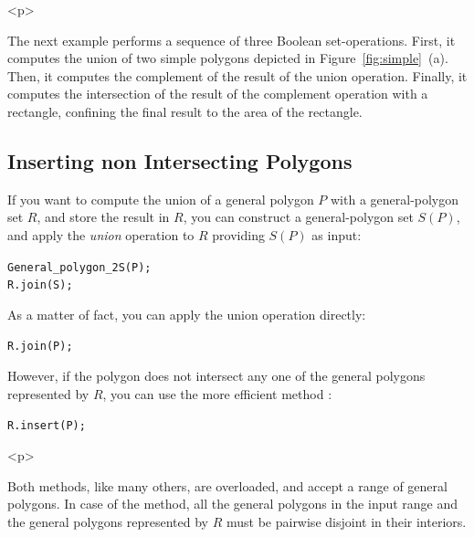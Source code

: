 \begin{ccHtmlOnly}<p>\end{ccHtmlOnly}
The next example performs a sequence of three Boolean set-operations.
First, it computes the union of two simple polygons depicted in
Figure~\ref{fig:simple}~(a). Then, it computes the complement of the result
of the union operation. Finally, it computes the intersection of the result
of the complement operation with a rectangle, confining the final result to 
the area of the rectangle.


\subsection{Inserting non Intersecting Polygons}
\label{bso_ssec:insert}
If you want to compute the union of a general polygon $P$ with a
general-polygon set $R$, and store the result in $R$, you can construct
a general-polygon set $S(P)$, and apply the {\em union} operation to
$R$ providing $S(P)$ as input:

\begin{alltt}
General_polygon_2 S(P);
R.join(S);
\end{alltt}

As a matter of fact, you can apply the union operation directly:

\begin{alltt}
R.join(P);
\end{alltt}

However, if the polygon does not intersect any one of the general
polygons represented by $R$, you can use the more efficient method
:

\begin{alltt}
R.insert(P);
\end{alltt}

\begin{ccHtmlOnly}<p>\end{ccHtmlOnly}
Both methods, like many others, are overloaded, and accept a range of
general polygons. In case of the  method, all the general
polygons in the input range and the general polygons represented by
$R$ must be pairwise disjoint in their interiors.

